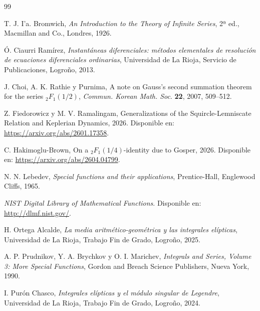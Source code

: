 \documentclass[12pt,a4paper]{book}
\begin{document}
\cleardoublepage 

\begin{thebibliography}{99}

    T. J. I'a. Bromwich, \textit{An Introduction to the Theory of Infinite Series}, 2ª ed., Macmillan and Co., Londres, 1926.

    Ó. Ciaurri Ramírez, \textit{Instantáneas diferenciales: métodos elementales de resolución de ecuaciones diferenciales ordinarias}, Universidad de La Rioja, Servicio de Publicaciones, Logroño, 2013.

    J. Choi, A. K. Rathie y Purnima, A note on Gauss's second summation theorem for the series ${}_{2}F_{1}(1/2)$, \textit{Commun. Korean Math. Soc}. \textbf{22}, 2007, 509--512.

    Z. Fiedorowicz y M. V. Ramalingam, Generalizations of the Squircle-Lemniscate Relation and Keplerian Dynamics, 2026. Disponible en: \url{https://arxiv.org/abs/2601.17358}.

    C. Hakimoglu-Brown, On a ${}_{2}F_{1}(1/4)$-identity due to Gosper, 2026. Disponible en: \url{https://arxiv.org/abs/2604.04799}.

    N. N. Lebedev, \textit{Special functions and their applications}, Prentice-Hall, Englewood Cliffs, 1965.

    \textit{NIST Digital Library of Mathematical Functions}. Disponible en: \url{http://dlmf.nist.gov/}. 

    H. Ortega Alcalde, \textit{La media aritmético-geométrica y las integrales elípticas}, Universidad de La Rioja, Trabajo Fin de Grado, Logroño, 2025.

    A. P. Prudnikov, Y. A. Brychkov y O. I. Marichev, \textit{Integrals and Series, Volume 3: More Special Functions}, Gordon and Breach Science Publishers, Nueva York, 1990.

    I. Purón Chasco, \textit{Integrales elípticas y el módulo singular de Legendre}, Universidad de La Rioja, Trabajo Fin de Grado, Logroño, 2024.

\end{thebibliography}
\end{document}
